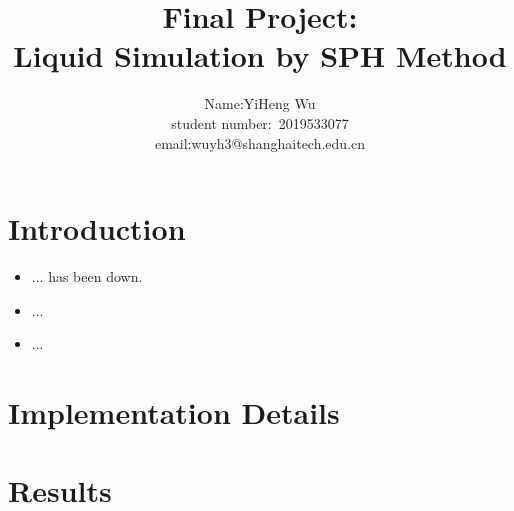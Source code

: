 \documentclass[acmtog]{acmart}
\title{Final Project:\\ {Liquid Simulation by SPH Method}}
\author{Name:\quad YiHeng Wu  \\ student number:\ 2019533077
\\email:\quad wuyh3@shanghaitech.edu.cn}
\begin{document}
\maketitle

\vspace*{2 ex}

\section{Introduction}
\begin{itemize}
\item ... has been down.
\item ...
\item ...
\end{itemize}
\section{Implementation Details}

\section{Results}
\end{document}
